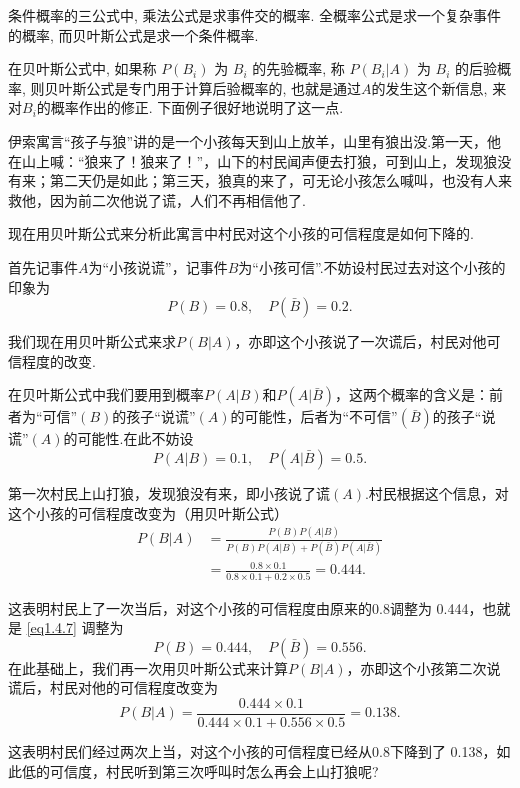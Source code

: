 条件概率的三公式中,
乘法公式是求事件交的概率.
全概率公式是求一个复杂事件的概率,
而贝叶斯公式是求一个条件概率.

在贝叶斯公式中,
如果称 $P(B_i)$ 为 $B_i$ 的先验概率,
称 $P(B_i |A)$ 为 $B_i$ 的后验概率, 则贝叶斯公式是专门用于计算后验概率的, 也就是通过$A$的发生这个新信息, 来对$B_i$的概率作出的修正. 下面例子很好地说明了这一点.

\begin{example}
  伊索寓言“孩子与狼”讲的是一个小孩每天到山上放羊，山里有狼出没.第一天，他在山上喊：“狼来了！狼来了！”，山下的村民闻声便去打狼，可到山上，发现狼没有来；第二天仍是如此；第三天，狼真的来了，可无论小孩怎么喊叫，也没有人来救他，因为前二次他说了谎，人们不再相信他了.
\end{example}

现在用贝叶斯公式来分析此寓言中村民对这个小孩的可信程度是如何下降的.

首先记事件$A$为“小孩说谎”，记事件$B$为“小孩可信”.不妨设村民过去对这个小孩的印象为
\begin{equation}\label{eq1.4.7}
  P(B) = 0.8,\quad P(\bar B) = 0.2.
\end{equation}

我们现在用贝叶斯公式来求$P(B|A)$，亦即这个小孩说了一次谎后，村民对他可信程度的改变.

在贝叶斯公式中我们要用到概率$P(A|B)$和$P(A|\bar B)$，这两个概率的含义是：前者为“可信”$(B)$的孩子“说谎”$(A)$的可能性，后者为“不可信”$(\bar B)$的孩子“说谎”$(A)$的可能性.在此不妨设
\[
  P(A|B) = 0.1,\quad P(A|\bar B) = 0.5.
\]

第一次村民上山打狼，发现狼没有来，即小孩说了谎$(A)$.村民根据这个信息，对这个小孩的可信程度改变为（用贝叶斯公式）
\begin{align*}
  P(B|A) & = \frac{P(B)P(A|B)}{P(B)P(A|B) + P(\bar B)P(A|\bar B) } \\
  & = \frac{0.8\times0.1}{0.8\times0.1 + 0.2\times0.5} = 0.444.
\end{align*}

这表明村民上了一次当后，对这个小孩的可信程度由原来的0.8调整为
0.444，也就是 \eqref{eq1.4.7} 调整为
\begin{equation}\label{eq1.4.8}
  P(B) = 0.444,\quad P(\bar B) = 0.556.
\end{equation}
在此基础上，我们再一次用贝叶斯公式来计算$P(B|A)$，亦即这个小孩第二次说谎后，村民对他的可信程度改变为
\[
  P(B|A) = \frac{0.444\times0.1}{0.444\times0.1 + 0.556\times0.5} = 0.138.
\]

这表明村民们经过两次上当，对这个小孩的可信程度已经从0.8下降到了
0.138，如此低的可信度，村民听到第三次呼叫时怎么再会上山打狼呢?

